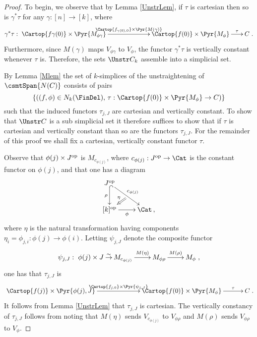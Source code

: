 \documentclass[a4paper]{article}
\numberwithin{equation}{section}
\begin{document}
\begin{proof}
 To begin, we observe that by Lemma \ref{UnstrLem}, if $\tau$ is cartesian then so is $\gamma^*\tau$ for any $\gamma:[n] \to [k]$, where
 \begin{equation*}
  \gamma^* \tau: \xymatrixcolsep{1.5pc}\xymatrix{\Cartop{f\gamma(0)}\times\Pyr{M_{\phi\gamma}} \ar[rrr]^-{\Cartop{f_{\gamma(0),0}}\times\Pyr{M(\gamma)}}& & &  \Cartop{f(0)}\times\Pyr{M_\phi} \ar[r]^-\tau & C}.
 \end{equation*}
 Furthermore, since $M(\gamma)$ maps $V_{ \phi\gamma}$ to $V_\phi$, the functor $\gamma^*\tau$ is vertically constant whenever $\tau$ is. Therefore, the sets $\Unstr C_k$ assemble into a simplicial set.
 
 By Lemma \ref{Mlem} the set of $k$-simplices of the unstraightening of $\csmtSpan{N(C)}$ consists of pairs
 \begin{equation*}
  \left\{ \left((f,\phi)\in N_k(\FinDel), \, \tau: \Cartop{f(0)}\times\Pyr{M_\phi} \to C\right)\right\}
 \end{equation*}
such that the induced functors $\tau_{j,J}$ are cartesian and vertically constant. To show that $\Unstr C$ is a sub simplicial set it therefore suffices to show that if $\tau$ is cartesian and vertically constant than so are the functors $\tau_{j,J}$. For the remainder of this proof we shall fix a cartesian, vertically constant functor $\tau$. 

Observe that $\phi(j) \times J^{\rm op}$ is $M_{c_{\phi(j)}}$, where $c_{\phi(j)}: J^{\rm op} \to \Cat$ is the constant functor on $\phi(j)$, and that one has a diagram
\begin{equation*}
\xymatrix{ J^{\rm op} \ar@{^{(}->}[d]_-\rho \ar[rd]^-{c_{\phi(j)}}& \ar@{}[ld]^(.5){}="a"^(.85){}="b" \ar@{=>}_\eta "a";"b" \\
 [k]^{\rm op} \ar[r]_-\phi & \Cat \, ,}
\end{equation*}
where $\eta$ is the natural transformation having components $\eta_i=\phi_{j,i}: \phi(j) \to \phi(i)$. Letting $\psi_{j,J}$ denote the composite functor
\begin{equation*}
 \psi_{j,J}:\xymatrixcolsep{.7pc}\xymatrix{ \phi(j) \times J \ar[r]^-\sim & M_{c_{\phi(j)}} \ar[rr]^-{M(\eta)} & & M_{\phi \rho} \ar[rr]^-{M(\rho)} & & M_\phi}, 
\end{equation*}
one has that $\tau_{j,J}$ is
\begin{equation*}
 \xymatrixcolsep{2.5pc} \xymatrix {\Cartop{f(j)}\times\Pyr{\phi(j),J} \ar[rr]^-{\Cartop{f_{j,0}} \times \Pyr{\psi_{j,J}}} & &  \Cartop{f(0)}\times\Pyr{M_\phi} \ar[r]^-\tau & C}.
\end{equation*}
It follows from Lemma \ref{UnstrLem} that $\tau_{j,J}$ is cartesian. The vertically constancy of $\tau_{j,J}$ follows from noting that $M(\eta)$ sends $V_{c_{\phi(j)}}$ to $V_{\phi \rho}$ and $M(\rho)$ sends $V_{\phi \rho}$ to $V_\phi$.
\end{proof}
\end{document}
